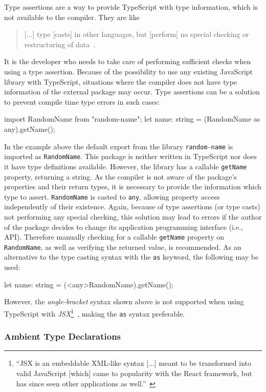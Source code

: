 Type assertions are a way to provide TypeScript with type information, which is not available to the compiler. They are like
\begin{quote}
  [...] type [casts] in other languages, but [perform] no special checking or restructuring of data~\cite{TypeScriptHandbook:BasicTypes}.
\end{quote}
It is the developer who needs to take care of performing sufficient checks when using a type assertion. Because of the possibility to use any existing JavaScript library with TypeScript, situations where the compiler does not have type information of the external package may occur. Type assertions can be a solution to prevent compile time type errors in such cases:
\begin{JsCode}[numbers=none]
import RandomName from "random-name";
let name: string = (RandomName as any).getName();
\end{JsCode}
In the example above the default export from the library \texttt{random-name} is imported as \texttt{RandomName}. This package is neither written in TypeScript nor does it have type definitions available. However, the library has a callable \texttt{getName} property, returning a string. As the compiler is not aware of the package's properties and their return types, it is necessary to provide the information which type to assert. \texttt{RandomName} is casted to \texttt{any}, allowing property access independently of their existence. Again, because of type assertions (or type casts) not performing any special checking, this solution may lead to errors if the author of the package decides to change its application programming interface (i.e., API). Therefore manually checking for a callable \texttt{getName} property on \texttt{RandomName}, as well as verifying the returned value, is recommended.
As an alternative to the type casting syntax with the \texttt{as} keyword, the following may be used:
\begin{JsCode}[numbers=none]
let name: string = (<any>RandomName).getName();
\end{JsCode}
However, the \emph{angle-bracket} syntax shown above is not supported when using TypeScript with \emph{JSX}\footnote{``JSX is an embeddable XML-like syntax [...] meant to be transformed into valid JavaScript [which] came to popularity with the React framework, but has since seen other applications as well.''~\cite{TypeScriptHandbook:JSX}}~\cite{TypeScriptHandbook:BasicTypes}, making the \texttt{as} syntax preferable.

\subsubsection{Ambient Type Declarations}
\label{sec:ts-ambient-type-declarations}

